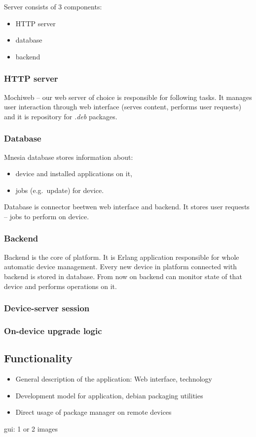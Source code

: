 Server consists of 3 components:
\begin{itemize}
  \item HTTP server
  \item database
  \item backend
\end{itemize}


\subsubsection*{HTTP server}

Mochiweb -- our web server of choice is responsible for following tasks. It manages user interaction
through web interface (serves content, performs user requests) and it is repository for \emph{.deb}
packages.


\subsubsection*{Database}

Mnesia database stores information about:
\begin{itemize}
  \item device and installed applications on it,
  \item jobs (e.g.\ update) for device.
\end{itemize}

\noindent Database is connector beetwen web interface and backend. It stores user requests -- jobs to perform
on device.


\subsubsection*{Backend}

Backend is the core of platform. It is Erlang application responsible for whole automatic device
management. Every new device in platform connected with backend is stored in database.
From now on backend can monitor state of that device and performs operations on it.

\subsubsection{Device-server session}
\subsubsection{On-device upgrade logic}

\subsection{Functionality}

\begin{itemize}
	\item General description of the application: Web interface, technology
    \item Development model for application, debian packaging utilities
    \item Direct usage of package manager on remote devices 
\end{itemize}

gui: 1 or 2 images 

